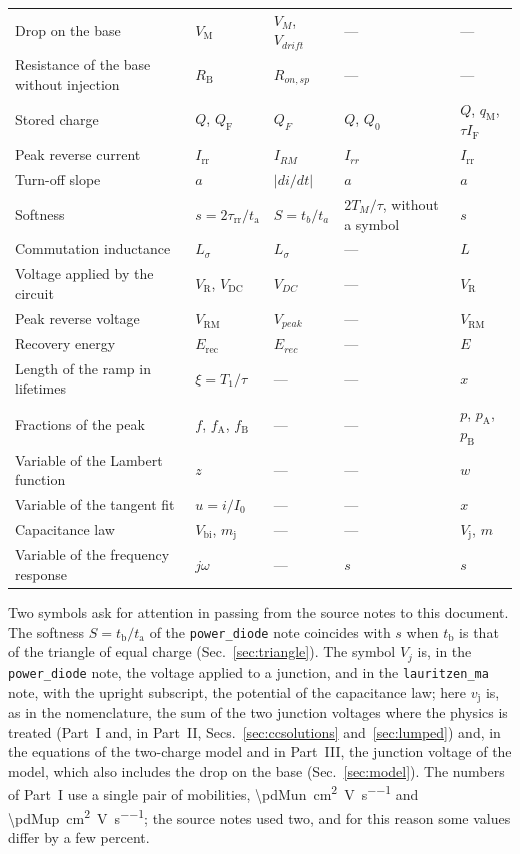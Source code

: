 \documentclass[10pt,a4paper]{scrartcl}
\newcommand{\IF}{I_\mathrm{F}}
\newcommand{\VR}{V_\mathrm{R}}
\newcommand{\Irr}{I_\mathrm{rr}}
\newcommand{\ta}{t_\mathrm{a}}
\newcommand{\tb}{t_\mathrm{b}}
\newcommand{\taurr}{\tau_\mathrm{rr}}
\newcommand{\Tone}{T_1}
\newcommand{\qM}{q_\mathrm{M}}
\newcommand{\vj}{v_\mathrm{j}}
\newcommand{\Vrm}{V_\mathrm{RM}}
\newcommand{\Ls}{L_\sigma}                    %
\newcommand{\VM}{V_\mathrm{M}}
\newcommand{\Vbi}{V_\mathrm{bi}}
\newcommand{\Vdc}{V_\mathrm{DC}}
\newcommand{\QF}{Q_\mathrm{F}}
\newcommand{\Erec}{E_\mathrm{rec}}
\begin{document}
\begin{table}[htb]
\begin{tabular}{@{}>{\raggedright\arraybackslash}p{4.3cm}llll@{}}
Drop on the base & $\VM$ & $V_M$, $V_{drift}$ & --- & --- \\
Resistance of the base without injection & $R_\mathrm{B}$ & $R_{on,sp}$ & --- & --- \\
Stored charge & $Q$, $\QF$ & $Q_F$ & $Q$, $Q_0$ & $Q$, $\qM$, $\tau\IF$ \\
Peak reverse current & $\Irr$ & $I_{RM}$ & $I_{rr}$ & $\Irr$ \\
Turn-off slope & $a$ & $|di/dt|$ & $a$ & $a$ \\
Softness & $s = 2\taurr/\ta$ & $S = t_b/t_a$ & $2T_M/\tau$, without a symbol & $s$ \\
Commutation inductance & $\Ls$ & $L_\sigma$ & --- & $L$ \\
Voltage applied by the circuit & $\VR$, $\Vdc$ & $V_{DC}$ & --- & $\VR$ \\
Peak reverse voltage & $\Vrm$ & $V_{peak}$ & --- & $\Vrm$ \\
Recovery energy & $\Erec$ & $E_{rec}$ & --- & $E$ \\
Length of the ramp in lifetimes & $\xi = \Tone/\tau$ & --- & --- & $x$ \\
Fractions of the peak & $f$, $f_\mathrm{A}$, $f_\mathrm{B}$ & --- & --- & $p$, $p_\mathrm{A}$, $p_\mathrm{B}$ \\
Variable of the Lambert function & $z$ & --- & --- & $w$ \\
Variable of the tangent fit & $u = i/I_0$ & --- & --- & $x$ \\
Capacitance law & $\Vbi$, $m_\mathrm{j}$ & --- & --- & $V_\mathrm{j}$, $m$ \\
Variable of the frequency response & $j\omega$ & --- & $s$ & $s$ \\
\bottomrule
\end{tabular}
\end{table}

Two symbols ask for attention in passing from the source notes to this document. The softness $S = \tb/\ta$ of the \texttt{power\_diode} note coincides with $s$ when $\tb$ is that of the triangle of equal charge (Sec.~\ref{sec:triangle}). The symbol $V_j$ is, in the \texttt{power\_diode} note, the voltage applied to a junction, and in the \texttt{lauritzen\_ma} note, with the upright subscript, the potential of the capacitance law; here $\vj$ is, as in the nomenclature, the sum of the two junction voltages where the physics is treated (Part~I and, in Part~II, Secs.~\ref{sec:ccsolutions} and~\ref{sec:lumped}) and, in the equations of the two-charge model and in Part~III, the junction voltage of the model, which also includes the drop on the base (Sec.~\ref{sec:model}). The numbers of Part~I use a single pair of mobilities, \SI{\pdMun}{\centi\metre\squared\per\volt\per\second} and \SI{\pdMup}{\centi\metre\squared\per\volt\per\second}; the source notes used two, and for this reason some values differ by a few percent.
\end{document}
